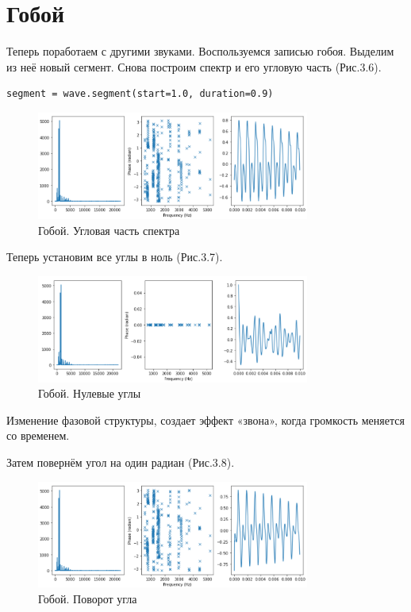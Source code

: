 \documentclass[a4paper,12pt]{report}
\begin{document}
\section{Гобой} 
    Теперь поработаем с другими звуками. Воспользуемся записью гобоя. Выделим из неё новый сегмент. Снова построим спектр и его угловую часть (Рис.3.6).
\begin{lstlisting}[caption=Выделение сегмента]
       segment = wave.segment(start=1.0, duration=0.9)
\end{lstlisting}
\begin{figure}[H]
        \centering
        \includegraphics[width=0.8\textwidth]{fig3-6.PNG}
        \caption{Гобой. Угловая часть спектра}
        \label{fig:fig3-6}
\end{figure} 

    Теперь установим все углы в ноль (Рис.3.7).
\begin{figure}[H]
        \centering
        \includegraphics[width=0.8\textwidth]{fig3-7.PNG}
        \caption{Гобой. Нулевые углы}
        \label{fig:fig3-7}
\end{figure} 

    Изменение фазовой структуры, создает эффект «звона», когда громкость меняется со временем.
    
    Затем повернём угол на один радиан (Рис.3.8).    
\begin{figure}[H]
        \centering
        \includegraphics[width=0.8\textwidth]{fig3-8.PNG}
        \caption{Гобой. Поворот угла}
        \label{fig:fig3-8}
\end{figure}  
    
\end{document}
